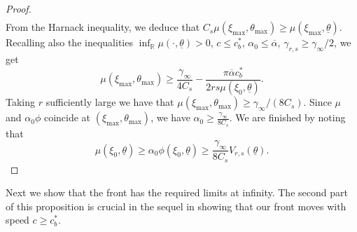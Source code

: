 \documentclass[11pt]{article}    %
\newcommand{\R}{\mathbb{R}}
\begin{document}
\begin{proof}
\begin{equation}
\begin{split}
\end{split}
\end{equation}
From the Harnack inequality, we deduce that $C_s \mu(\xi_{\max},\theta_{\max}) \geq \mu(\xi_{\max},\underline\theta) $.  Recalling also the inequalities $\inf_{\R} \mu(\cdot,\underline\theta) > 0$, $c \leq c_b^*$, $\alpha_0 \leq \overline\alpha$, $\gamma_{r,s} \geq \gamma_\infty/2$, we get
\begin{equation*}
\mu(\xi_{\max} , \theta_{\max}) \geq \displaystyle  \frac{ \gamma_\infty}{4C_s} - \frac{ \pi \overline \alpha c_b^*}{2 r s \mu(\xi_0,\underline\theta)}.
\end{equation*}
Taking $r$ sufficiently large we have that $\mu(\xi_{\max}, \theta_{\max}) \geq \gamma_\infty/(8C_s)$.  
Since $\mu$ and $\alpha_0 \phi$ coincide at $(\xi_{\max},\theta_{\max})$, we have $\alpha_0 \geq \frac{\gamma_\infty }{8C_s}$. We are finished by noting that
\begin{equation*}
	\mu(\xi_0,\underline\theta) \geq \alpha_0 \phi(\xi_0,\underline\theta)
		\geq \frac{\gamma_\infty}{8 C_s } V_{r,s}(\underline\theta).
\end{equation*}
\end{proof}
















Next we show that the front has the required limits at infinity.  The second part of this proposition is crucial in the sequel in showing that our front moves with speed $c \geq c^*_b$.
\end{document}
